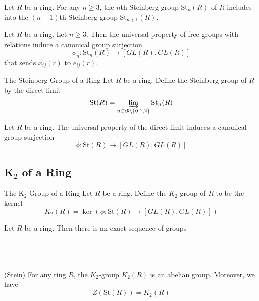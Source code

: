 \documentclass[a4paper]{article}
\begin{document}
\begin{lmm}{}{} Let $R$ be a ring. For any $n\geq 3$, the $n$th Steinberg group $\text{St}_n(R)$ of $R$ includes into the $(n+1)$th Steinberg group $\text{St}_{n+1}(R)$. 
\end{lmm}

\begin{prp}{}{} Let $R$ be a ring. Let $n\geq 3$. Then the universal property of free groups with relations induce a canonical group surjection $$\phi_n:\text{St}_n(R)\to[GL(R),GL(R)]$$ that sends $x_{ij}(r)$ to $e_{ij}(r)$. 
\end{prp}

\begin{defn}{The Steinberg Group of a Ring}{} Let $R$ be a ring. Define the Steinberg group of $R$ by the direct limit $$\text{St}(R)=\varinjlim_{n\in\N\setminus\{0,1,2\}}\text{St}_n(R)$$
\end{defn}

\begin{prp}{}{} Let $R$ be a ring. The universal property of the direct limit induces a canonical group surjection $$\phi:\text{St}(R)\to[GL(R),GL(R)]$$
\end{prp}

\subsection{K${_2}$ of a Ring}
\begin{defn}{The K${_2}$-Group of a Ring}{} Let $R$ be a ring. Define the $K_2$-group of $R$ to be the kernel $$K_2(R)=\ker\left(\phi:\text{St}(R)\to[GL(R),GL(R)]\right)$$
\end{defn}

\begin{lmm}{}{} Let $R$ be a ring. Then there is an exact sequence of groups \\~\\
\\~\\
\end{lmm}

\begin{thm}{(Stein)}{} For any ring $R$, the $K_2$-group $K_2(R)$ is an abelian group. Moreover, we have $$Z(\text{St}(R))=K_2(R)$$
\end{thm}
\end{document}
